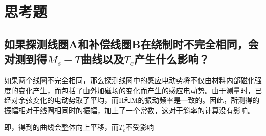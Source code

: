 \documentclass[a4paper]{article}
\begin{document}
\section{思考题}
\subsection*{如果探测线圈A和补偿线圈B在绕制时不完全相同，会对测到得$M_s - T$曲线以及$T_c$产生什么影响？}
如果两个线圈不完全相同，那么探测线圈中的感应电动势将不仅由材料内部磁化强度的变化产生，而包括了由外加磁场的变化而产生的感应电动势。由于测量时，已经对余弦变化的电动势取了平均，而H和M的振动频率是一致的。因此，所测得的振幅相对于线圈相同时的振幅，加上了一个常数，这对于斜率的计算没有影响。

即，得到的曲线会整体向上平移，而$T_{c}$不受影响
\nocite{jiaocai}

\end{document}
